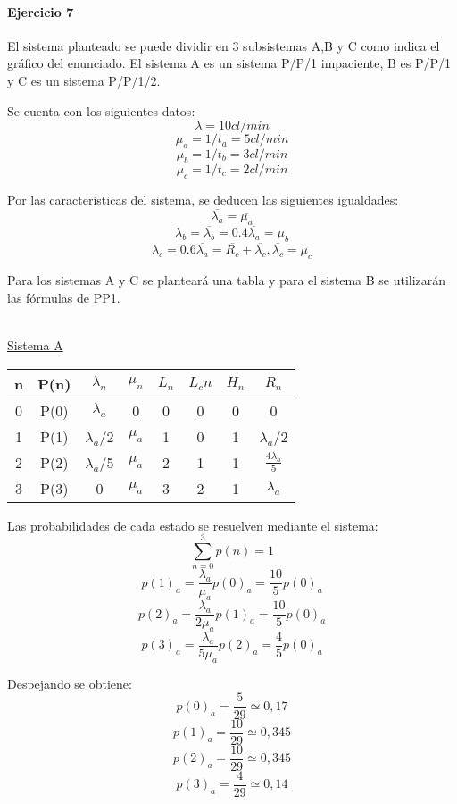 \documentclass{article}
\begin{document}
\paragraph{Ejercicio 7}
  El sistema planteado se puede dividir en 3 subsistemas A,B y C como indica el gráfico del enunciado. 
  El sistema A es un sistema P/P/1 impaciente, B es P/P/1 y C es un sistema P/P/1/2.
  
  Se cuenta con los siguientes datos: \\
  $$ \lambda = 10 cl/min $$
  $$ \mu_a = 1/t_a = 5 cl/min $$
  $$ \mu_b = 1/t_b = 3 cl/min $$
  $$ \mu_c = 1/t_c = 2 cl/min $$
 
  Por las características del sistema, se deducen las siguientes igualdades: \\
  $$ \overline{\lambda_a} = \overline{\mu_a}$$
  $$ \lambda_b = \overline{\lambda_b} = 0.4 \overline{\lambda_a} = \overline{\mu_b}$$
  $$ \lambda_c = 0.6 \overline{\lambda_a} = \overline{R_c} + \overline{\lambda_c} , \overline{\lambda_c} = \overline{\mu_c}$$
  
 Para los sistemas A y C se planteará una tabla y para el sistema B se utilizarán las fórmulas de PP1. \\ \\

 \begin{center}
  \underline{Sistema A} \\ 
    \begin{tabular}{|| c | c | c | c | c | c | c | c ||}
    \hline 
     n & P(n) & $\lambda_n$ & $\mu_n$ & $L_n$& $L_cn$ & $H_n$ & $R_n$ 			\\ \hline \hline
     0 & P(0) & $\lambda_a$   & 0       & 0    & 0      & 0     & 0			\\ \hline
     1 & P(1) & $\lambda_a$/2 & $\mu_a$ & 1    & 0      & 1     & $\lambda_a$/2		\\ \hline
     2 & P(2) & $\lambda_a$/5 & $\mu_a$ & 2    & 1      & 1     & $\frac{4\lambda_a}{5}$	\\ \hline
     3 & P(3) &  0            & $\mu_a$ & 3    & 2      & 1     & $\lambda_a$ 		\\ \hline
     
    \end{tabular}
    
    Las probabilidades de cada estado se resuelven mediante el sistema: 
    $$ \sum_{n=0}^{3}p(n) = 1 $$
    $$ p(1)_a = \frac{\lambda_a}{\mu_a} p(0)_a = \frac{10}{5} p(0)_a $$
    $$ p(2)_a = \frac{\lambda_a}{2\mu_a} p(1)_a = \frac{10}{5} p(0)_a$$
    $$ p(3)_a = \frac{\lambda_a}{5\mu_a} p(2)_a = \frac{4}{5} p(0)_a$$
    
    Despejando se obtiene: 
    $$ p(0)_a = \frac{5}{29} \simeq 0,17 $$
    $$ p(1)_a = \frac{10}{29} \simeq 0,345 $$
    $$ p(2)_a = \frac{10}{29} \simeq 0,345 $$
    $$ p(3)_a = \frac{4}{29} \simeq 0,14 $$
    
  \end{center} 
  
\end{document}
